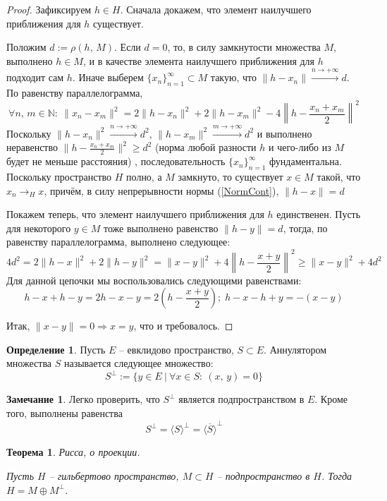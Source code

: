 \documentclass[a4paper,12pt]{article}
\renewcommand{\geq}{\ensuremath{\geqslant}}
\theoremstyle{plain}
\newtheorem{theorem}{Теорема}[section]
\theoremstyle{definition}
\newtheorem{definition}{Определение}[section]
\newtheorem*{note}{Замечание}
\theoremstyle{remark}
\begin{document}
\begin{proof}
	Зафиксируем $h \in H$. Сначала докажем, что элемент наилучшего приближения для $h$ существует.

	Положим $d := \rho(h,\, M)$. Если $d = 0$, то, в силу замкнутости множества $M$, выполнено $h \in M$, и в качестве элемента наилучшего приближения для $h$ подходит сам $h$. Иначе выберем $\{x_n\}_{n = 1}^\infty \subset M$ такую, что $\|h - x_n\| \overset{n \to +\infty}{\to} d$. По равенству параллелограмма,
	\[
		\forall n,\,m \in \mathbb{N} :\: \|x_n - x_m\|^2 = 2 \|h - x_n\|^2 + 2\|h - x_m\|^2 - 4\left\|h - \frac{x_n + x_m}{2}\right\|^2
	\]
	Поскольку $\|h - x_n\|^2 \overset{n \to +\infty}{\to} d^2,\, \|h - x_m\|^2 \overset{m \to +\infty}{\to} d^2$ и выполнено неравенство $\|h - \frac{x_n + x_m}{2}\|^2 \geq d^2$ (норма любой разности $h$ и чего-либо из $M$ будет не меньше расстояния) , последовательность $\{x_n\}_{n = 1}^\infty$ фундаментальна. Поскольку пространство $H$ полно, а $M$ замкнуто, то существует $x \in M$ такой, что $x_n \to_H x$, причём, в силу непрерывности нормы (\ref{NormCont}), $\|h - x\| = d$

	Покажем теперь, что элемент наилучшего приближения для $h$ единственен. Пусть для некоторого $y \in M$ тоже выполнено равенство $\|h - y\| = d$, тогда, по равенству параллелограмма, выполнено следующее:
	\[
		4d^2= 2\|h - x\|^2 + 2\|h - y\|^2 = \|x - y\|^2 + 4\left\|h - \frac{x + y}{2}\right\|^2 \geq \|x - y\|^2 + 4d^2
	\]
	Для данной цепочки мы воспользовались следующими равенствами:
	\[
		h - x + h - y = 2h - x - y = 2\left(h - \frac{x + y}{2}\right);\; h - x - h + y = -(x - y)
	\]

	Итак, $\|x - y\| =0 \Rightarrow x = y$, что и требовалось.
\end{proof}

\begin{definition}
	Пусть $E$ -- евклидово пространство, $S \subset E$. Аннулятором множества $S$ называется следующее множество:
	\[
		S^\bot := \{y \in E \:\vert\: \forall x \in S :\: (x,\,y) = 0 \}
	\]
\end{definition}

\begin{note}
	Легко проверить, что $S^\bot$ является подпространством в $E$. Кроме того, выполнены равенства
	\[
		S^\bot = \langle S\rangle^\bot = \overline{\langle S\rangle}^\bot
	\]
\end{note}

\begin{theorem}
	Рисса, о проекции.

	Пусть $H$ -- гильбертово пространство, $M \subset H$ -- подпространство в $H$. Тогда $H = M \oplus M^\bot$.
\end{theorem}
\end{document}
